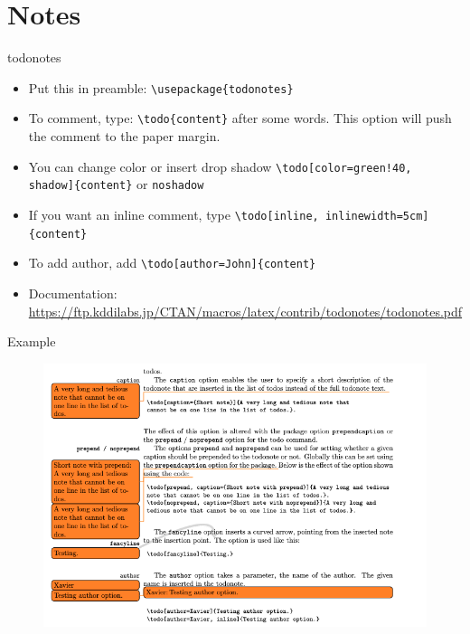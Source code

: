 \documentclass[
11pt, %
]{beamer}
\begin{document}
	\section{Notes}
	
	\begin{frame}{todonotes}
		\begin{itemize}
			\item Put this in preamble: \texttt{\textbackslash usepackage\{todonotes\}}
			\item To comment, type: \texttt{\textbackslash todo\{content\}}  after some words. This option will push the comment to the paper margin.
			\item You can change color or insert drop shadow \texttt{\textbackslash todo[color=green!40, shadow]\{content\}} or \texttt{noshadow}
			\item If you want an inline comment, type \texttt{\textbackslash todo[inline, inlinewidth=5cm]\{content\}}
			\item To add author, add \texttt{\textbackslash todo[author=John]\{content\}}
			\item Documentation: \url{https://ftp.kddilabs.jp/CTAN/macros/latex/contrib/todonotes/todonotes.pdf}
		\end{itemize}
	\end{frame}
	
	\begin{frame}{Example}
		\begin{figure}
			\includegraphics[scale=0.4]{note.png}
		\end{figure}
	\end{frame}
	
\end{document}
